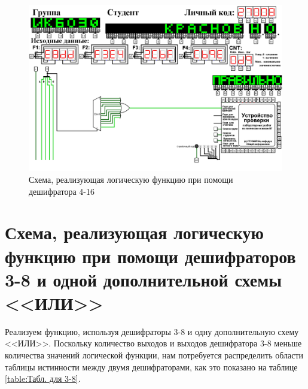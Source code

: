 \documentclass{mirea}
\begin{document}
\begin{figure}[ht]
	\includegraphics[width=\textwidth]{Дешифр 4-16 ИЛИ.png}
	\caption{Схема, реализующая логическую функцию при помощи дешифратора 4-16}
	\label{fig:Дешифр. 4-16}
\end{figure}

\section{Схема, реализующая логическую функцию при помощи дешифраторов 3-8 и одной дополнительной схемы <<ИЛИ>>}
Реализуем функцию, используя дешифраторы 3-8 и одну дополнительную схему <<ИЛИ>>. Поскольку количество выходов и выходов дешифратора 3-8 меньше количества значений логической функции, нам потребуется распределить области таблицы истинности между двумя дешифраторами, как это показано на таблице \ref{table:Табл. для 3-8}.
\end{document}
